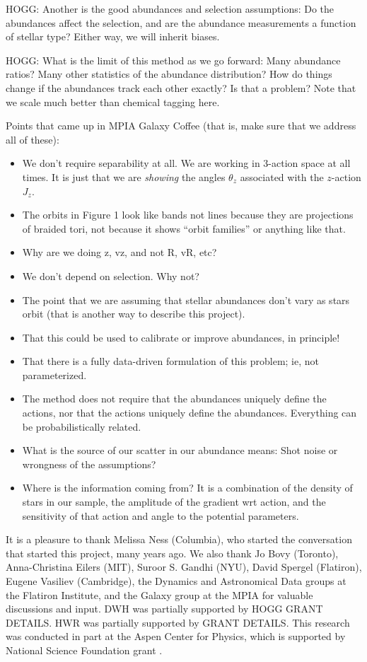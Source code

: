 \documentclass[modern]{aastex63}
\begin{document}
HOGG: Another is the good abundances and selection assumptions: Do the abundances affect
the selection, and are the abundance measurements a function of stellar type? Either way,
we will inherit biases.

HOGG: What is the limit of this method as we go forward: Many abundance ratios? Many other
statistics of the abundance distribution? How do things change if the abundances track
each other exactly? Is that a problem? Note that we scale much better than chemical tagging
here.

Points that came up in MPIA Galaxy Coffee (that is, make sure that we
address all of these):
\begin{itemize}
\item
  We don't require separability at all. We are working in 3-action
  space at all times. It is just that we are \emph{showing} the angles
  $\theta_z$ associated with the $z$-action $J_z$.
\item
  The orbits in Figure 1 look like bands not lines because they are
  projections of braided tori, not because it shows ``orbit families''
  or anything like that.
\item
  Why are we doing z, vz, and not R, vR, etc?
\item
  We don't depend on selection. Why not?
\item
  The point that we are assuming that stellar abundances don't vary as
  stars orbit (that is another way to describe this project).
\item
  That this could be used to calibrate or improve abundances, in
  principle!
\item
  That there is a fully data-driven formulation of this problem; ie, not
  parameterized.
\item
  The method does not require that the abundances uniquely define the
  actions, nor that the actions uniquely define the
  abundances. Everything can be probabilistically related.
\item
  What is the source of our scatter in our abundance means: Shot noise
  or wrongness of the assumptions?
\item
  Where is the information coming from? It is a combination of the
  density of stars in our sample, the amplitude of the gradient wrt
  action, and the sensitivity of that action and angle to the potential
  parameters.
\end{itemize}

\acknowledgments
It is a pleasure to thank
  Melissa Ness (Columbia),
  who started the conversation that started this project, many years ago.
We also thank
  Jo Bovy (Toronto),
  Anna-Christina Eilers (MIT),
  Suroor S. Gandhi (NYU),
  David Spergel (Flatiron),
  Eugene Vasiliev (Cambridge),
  the Dynamics and Astronomical Data groups at the Flatiron Institute,
  and the Galaxy group at the MPIA
for valuable discussions and input.
DWH was partially supported by HOGG GRANT DETAILS.
HWR was partially supported by GRANT DETAILS.
This research was conducted in part at the Aspen Center for Physics,
which is supported by National Science Foundation grant .
\end{document}

